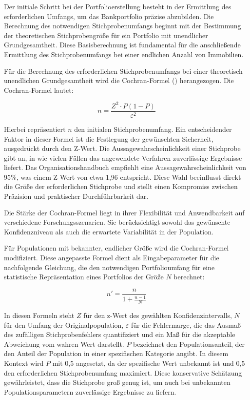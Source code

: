 Der initiale Schritt bei der Portfolioerstellung besteht in der Ermittlung des erforderlichen Umfangs, um das Bankportfolio präzise abzubilden. Die Berechnung des notwendigen Stichprobenumfangs beginnt mit der Bestimmung der theoretischen Stichprobengröße für ein Portfolio mit unendlicher Grundgesamtheit. Diese Basisberechnung ist fundamental für die anschließende Ermittlung des Stichprobenumfangs bei einer endlichen Anzahl von Immobilien.

Für die Berechnung des erforderlichen Stichprobenumfangs bei einer theoretisch unendlichen Grundgesamtheit wird die Cochran-Formel (\cite{cochran1953sampling}) herangezogen. Die Cochran-Formel lautet:

\begin{equation}
n = \frac{Z^2 \cdot P(1 - P)}{\varepsilon^2}
\label{eq:cochran}
\end{equation}

Hierbei repräsentiert $n$ den initialen Stichprobenumfang. Ein entscheidender Faktor in dieser Formel ist die Festlegung der gewünschten Sicherheit, ausgedrückt durch den Z-Wert. Die Aussagewahrscheinlichkeit einer Stichprobe gibt an, in wie vielen Fällen das angewendete Verfahren zuverlässige Ergebnisse liefert. Das Organisationshandbuch empfiehlt eine Aussagewahrscheinlichkeit von 95\%, was einem Z-Wert von etwa 1,96 entspricht. Diese Wahl beeinflusst direkt die Größe der erforderlichen Stichprobe und stellt einen Kompromiss zwischen Präzision und praktischer Durchführbarkeit dar.

Die Stärke der Cochran-Formel liegt in ihrer Flexibilität und Anwendbarkeit auf verschiedene Forschungsszenarien. Sie berücksichtigt sowohl das gewünschte Konfidenzniveau als auch die erwartete Variabilität in der Population.

Für Populationen mit bekannter, endlicher Größe wird die Cochran-Formel modifiziert. Diese angepasste Formel dient als Eingabeparameter für die nachfolgende Gleichung, die den notwendigen Portfolioumfang für eine statistische Repräsentation eines Portfolios der Größe $N$ berechnet:

\begin{equation}
n' = \frac{n}{1 + \frac{n - 1}{N}}
\label{eq:finite_population}
\end{equation}

In diesen Formeln steht $Z$ für den z-Wert des gewählten Konfidenzintervalls, $N$ für den Umfang der Originalpopulation, $\varepsilon$ für die Fehlermarge, die das Ausmaß des zufälligen Stichprobenfehlers quantifiziert und ein Maß für die akzeptable Abweichung vom wahren Wert darstellt. $P$ bezeichnet den Populationsanteil, der den Anteil der Population in einer spezifischen Kategorie angibt. In diesem Kontext wird $P$ mit 0,5 angesetzt, da der spezifische Wert unbekannt ist und 0,5 den erforderlichen Stichprobenumfang maximiert. Diese konservative Schätzung gewährleistet, dass die Stichprobe groß genug ist, um auch bei unbekannten Populationsparametern zuverlässige Ergebnisse zu liefern.
